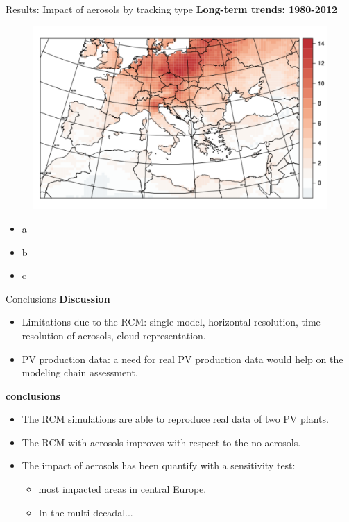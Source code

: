 \documentclass{beamer}%
\begin{document}
\begin{frame}[fragile]{Results: Impact of aerosols by tracking type}
\small{\textbf{Long-term trends: 1980-2012}}
\begin{figure}
\includegraphics[scale=0.38]{longterm.pdf}  
\end{figure}
\begin{itemize}
\item a
\item b
\item c
\end{itemize}  
\end{frame}

\begin{frame}[fragile]{Conclusions}
\textbf{\alert{Discussion}}
{\small{  \begin{itemize}
\item Limitations due to the RCM: single model, horizontal resolution, time resolution of aerosols, cloud representation. 
\item PV production data: a need for real PV production data would help on the modeling chain assessment.
\end{itemize}}}
\textbf{\alert{conclusions}}
{\small{\begin{itemize}
\item The RCM simulations are able to reproduce real data of two PV plants.
\item The RCM with aerosols improves with respect to the no-aerosols.
\item The impact of aerosols has been quantify with a sensitivity test:
  \begin{itemize}
  \item most impacted areas in central Europe.
  \item In the multi-decadal...
  \end{itemize}
\end{itemize}}}  
\end{frame}
\end{document}

